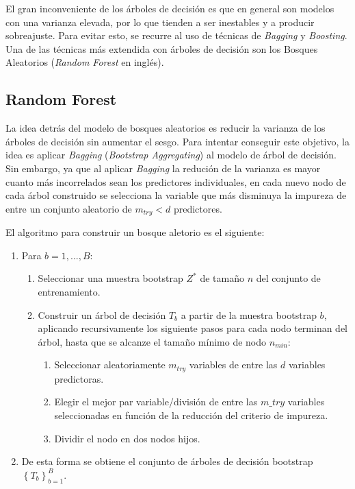 \documentclass[12pt,a4paper,]{book}
\providecommand{\tightlist}{%
  \setlength{\itemsep}{0pt}\setlength{\parskip}{0pt}}
\numberwithin{dummy}{section}
\theoremstyle{ocrenumbox}
\theoremstyle{blacknumex}
\theoremstyle{blacknumbox}
\theoremstyle{ocrenum}
\theoremstyle{ocrenum}
\begin{document}
El gran inconveniente de los árboles de decisión es que en general son
modelos con una varianza elevada, por lo que tienden a ser inestables y
a producir sobreajuste. Para evitar esto, se recurre al uso de técnicas
de \emph{Bagging} y \emph{Boosting}. Una de las técnicas más extendida
con árboles de decisión son los Bosques Aleatorios (\emph{Random Forest}
en inglés).

\hypertarget{random-forest}{%
\subsection{Random Forest}\label{random-forest}}

La idea detrás del modelo de bosques aleatorios es reducir la varianza
de los árboles de decisión sin aumentar el sesgo. Para intentar
conseguir este objetivo, la idea es aplicar \emph{Bagging}
(\emph{Bootstrap Aggregating}) al modelo de árbol de decisión. Sin
embargo, ya que al aplicar \emph{Bagging} la redución de la varianza es
mayor cuanto más incorrelados sean los predictores individuales, en cada
nuevo nodo de cada árbol construido se selecciona la variable que más
disminuya la impureza de entre un conjunto aleatorio de \(m_{try} < d\)
predictores.

El algoritmo para construir un bosque aletorio es el siguiente:

\begin{enumerate}
\def\labelenumi{\arabic{enumi}.}
\item
  Para \(b = {1,...,B}:\)

  \begin{enumerate}
  \def\labelenumii{\alph{enumii})}
  \item
    Seleccionar una muestra bootstrap \(Z^*\) de tamaño \(n\) del
    conjunto de entrenamiento.
  \item
    Construir un árbol de decisión \(T_b\) a partir de la muestra
    bootstrap \(b\), aplicando recursivamente los siguiente pasos para
    cada nodo terminan del árbol, hasta que se alcanze el tamaño mínimo
    de nodo \(n_{min}:\)

    \begin{enumerate}
    \def\labelenumiii{\roman{enumiii}.}
    \tightlist
    \item
      Seleccionar aleatoriamente \(m_{try}\) variables de entre las
      \(d\) variables predictoras.
    \item
      Elegir el mejor par variable/división de entre las \(m\_try\)
      variables seleccionadas en función de la reducción del criterio de
      impureza.
    \item
      Dividir el nodo en dos nodos hijos.
    \end{enumerate}
  \end{enumerate}
\item
  De esta forma se obtiene el conjunto de árboles de decisión bootstrap
  \(\left\{ T_b \right\}_{b=1}^B\).
\end{enumerate}
\end{document}
